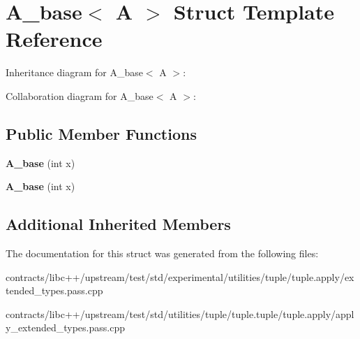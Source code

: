 \hypertarget{struct_a__base}{}\section{A\+\_\+base$<$ A $>$ Struct Template Reference}
\label{struct_a__base}


Inheritance diagram for A\+\_\+base$<$ A $>$\+:


Collaboration diagram for A\+\_\+base$<$ A $>$\+:
\subsection*{Public Member Functions}
\begin{DoxyCompactItemize}
\item 
\mbox{\label{struct_a__base_a176d85cde95e81569092e9de67836a84}} 
{\bfseries A\+\_\+base} (int x)
\item 
\mbox{\label{struct_a__base_a176d85cde95e81569092e9de67836a84}} 
{\bfseries A\+\_\+base} (int x)
\end{DoxyCompactItemize}
\subsection*{Additional Inherited Members}


The documentation for this struct was generated from the following files\+:\begin{DoxyCompactItemize}
\item 
contracts/libc++/upstream/test/std/experimental/utilities/tuple/tuple.\+apply/extended\+\_\+types.\+pass.\+cpp\item 
contracts/libc++/upstream/test/std/utilities/tuple/tuple.\+tuple/tuple.\+apply/apply\+\_\+extended\+\_\+types.\+pass.\+cpp\end{DoxyCompactItemize}
